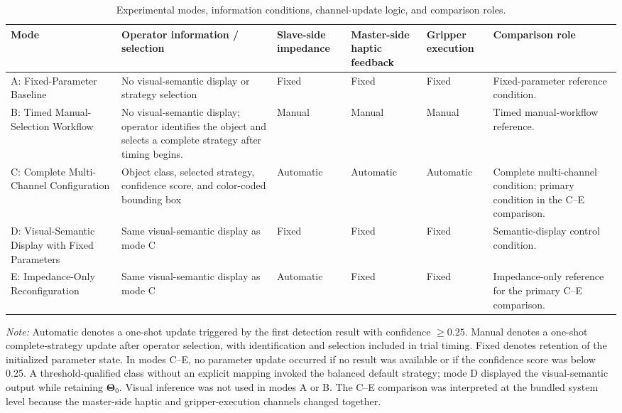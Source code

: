 \begin{table}[!t]
\centering
\caption{Experimental modes, information conditions, channel-update logic, and comparison roles.}
\label{tab:3}
\scriptsize
\setlength{\tabcolsep}{4pt}
\renewcommand{\arraystretch}{1.20}
\begin{tabularx}{\textwidth}{@{}p{}p{}>{\centering\arraybackslash}p{}>{\centering\arraybackslash}p{}>{\centering\arraybackslash}p{}Y@{}}
\toprule
Mode & Operator information / selection & Slave-side impedance & Master-side haptic feedback & Gripper execution & Comparison role \\
\midrule
A: Fixed-Parameter Baseline & No visual-semantic display or strategy selection & Fixed & Fixed & Fixed & Fixed-parameter reference condition. \\
B: Timed Manual-Selection Workflow & No visual-semantic display; operator identifies the object and selects a complete strategy after timing begins. & Manual & Manual & Manual & Timed manual-workflow reference. \\
C: Complete Multi-Channel Configuration & Object class, selected strategy, confidence score, and color-coded bounding box & Automatic & Automatic & Automatic & Complete multi-channel condition; primary condition in the C--E comparison. \\
D: Visual-Semantic Display with Fixed Parameters & Same visual-semantic display as mode C & Fixed & Fixed & Fixed & Semantic-display control condition. \\
E: Impedance-Only Reconfiguration & Same visual-semantic display as mode C & Automatic & Fixed & Fixed & Impedance-only reference for the primary C--E comparison. \\
\bottomrule
\end{tabularx}
\par\smallskip
\footnotesize\textit{Note:} Automatic denotes a one-shot update triggered by the first detection result with confidence $\geq 0.25$. Manual denotes a one-shot complete-strategy update after operator selection, with identification and selection included in trial timing. Fixed denotes retention of the initialized parameter state. In modes C--E, no parameter update occurred if no result was available or if the confidence score was below 0.25. A threshold-qualified class without an explicit mapping invoked the balanced default strategy; mode D displayed the visual-semantic output while retaining $\boldsymbol{\Theta}_0$. Visual inference was not used in modes A or B. The C--E comparison was interpreted at the bundled system level because the master-side haptic and gripper-execution channels changed together.
\end{table}

